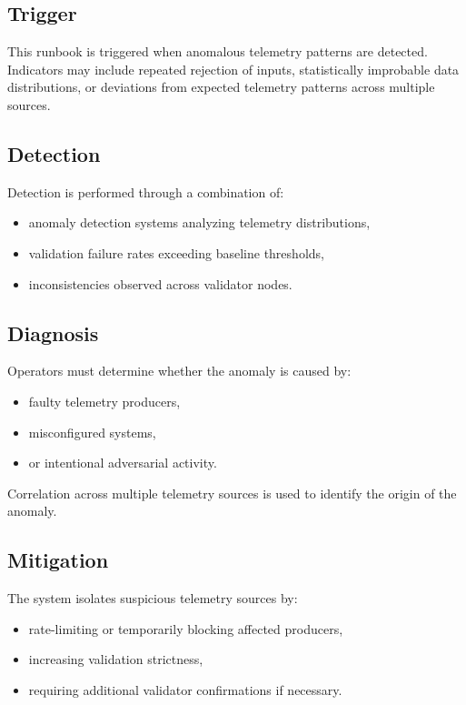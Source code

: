 \subsection{Trigger}

This runbook is triggered when anomalous telemetry patterns are detected. Indicators may include repeated rejection of inputs, statistically improbable data distributions, or deviations from expected telemetry patterns across multiple sources.

\subsection{Detection}

Detection is performed through a combination of:
\begin{itemize}
\item anomaly detection systems analyzing telemetry distributions,
\item validation failure rates exceeding baseline thresholds,
\item inconsistencies observed across validator nodes.
\end{itemize}

\subsection{Diagnosis}

Operators must determine whether the anomaly is caused by:
\begin{itemize}
\item faulty telemetry producers,
\item misconfigured systems,
\item or intentional adversarial activity.
\end{itemize}

Correlation across multiple telemetry sources is used to identify the origin of the anomaly.

\subsection{Mitigation}

The system isolates suspicious telemetry sources by:
\begin{itemize}
\item rate-limiting or temporarily blocking affected producers,
\item increasing validation strictness,
\item requiring additional validator confirmations if necessary.
\end{itemize}

